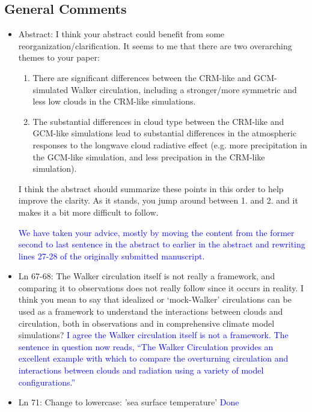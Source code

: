 \documentclass[draft]{agujournal2019}
\begin{document}
\subsection{General Comments}

\begin{itemize}
\item Abstract: 
I think your abstract could benefit from some  reorganization/clarification. It seems to me that there are two overarching themes to your paper:
    \begin{enumerate}
  \item There are significant differences between the CRM-like and GCM-simulated Walker circulation, including a stronger/more symmetric and less low clouds in the CRM-like simulations.
  \item The substantial differences in cloud type between the CRM-like and GCM-like simulations lead to substantial differences in the  atmospheric responses to the longwave cloud radiative effect (e.g. more precipitation in the GCM-like simulation, and less precipation in the CRM-like simulation). 
    \end{enumerate}
    I think the abstract should summarize these points in this order to help improve the clarity.
   As it stands, you jump around between 1. and 2. and it makes it a bit more difficult to follow. 
   
   \textcolor{blue}{We have taken your advice, mostly by moving the content from the former second to last sentence in the abstract to earlier in the abstract and rewriting lines 27-28 of 
   the originally submitted manuscript.}
    
\item Ln 67-68:  The Walker circulation itself is not really a framework, and comparing it to observations does not really follow since it occurs in reality. I think you mean to say that idealized or ‘mock-Walker’ circulations can be used as a framework to understand the interactions between clouds and circulation, both in observations and in comprehensive climate model simulations? 
  \textcolor{blue}{I agree the Walker circulation itself is not a framework.  The sentence in question now reads, ``The Walker Circulation provides an excellent example with which to compare the overturning circulation and interactions between clouds and radiation using a variety of model configurations.''}

\item Ln 71: Change to lowercase: 'sea surface temperature'  
  \textcolor{blue}{Done}
  

\end{itemize}
\end{document}
